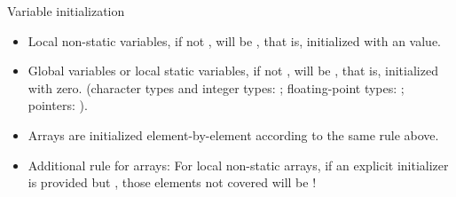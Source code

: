 \documentclass[handout]{beamer}
\begin{document}
\begin{frame}{Variable initialization}
    \begin{itemize}
        \item Local non-static variables, if not , will be , that is, initialized with an  value.
        \item Global variables or local static variables, if not , will be , that is, initialized with zero. (character types and integer types: ; floating-point types: ; pointers: ).
        \pause
        \item Arrays are initialized element-by-element according to the same rule above.
        \item Additional rule for arrays: For local non-static arrays, if an explicit initializer is provided but , those elements not covered will be !
    \end{itemize}
\end{frame}
\end{document}
